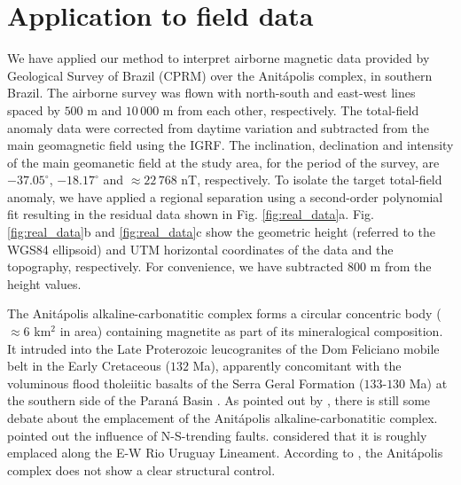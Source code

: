 \section{Application to field data}

We have applied our method to interpret airborne magnetic data provided by 
Geological Survey of Brazil (CPRM) over the Anit{\'a}polis complex, 
in southern Brazil. 
The airborne survey was flown with north-south and east-west lines spaced by $500$ m and $10\,000$ m from each other, respectively. 
The total-field anomaly data were corrected from daytime variation and 
subtracted from the main geomagnetic field using the IGRF. 
The inclination, declination and intensity of the main geomanetic field at the study area, 
for the period of the survey, are $-37.05^{\circ}$, $-18.17^{\circ}$ and 
$\approx 22 \, 768 $ nT, respectively.
To isolate the target total-field anomaly, we have applied 
a regional separation using a second-order polynomial fit resulting in the residual data 
shown in Fig. \ref{fig:real_data}a. 
Fig. \ref{fig:real_data}b and \ref{fig:real_data}c show the geometric height
(referred to the WGS84 ellipsoid) and UTM horizontal coordinates of the data and the 
topography, respectively. For convenience, we have subtracted $ 800 $ m from the height 
values.

The Anit{\'a}polis alkaline-carbonatitic complex forms a circular concentric body 
($\approx 6$ km$^{2}$ in area) containing magnetite as part of its mineralogical 
composition. It intruded into the Late Proterozoic leucogranites of the Dom Feliciano 
mobile belt in the Early Cretaceous ($132$ Ma), apparently concomitant with the 
voluminous flood tholeiitic basalts of the Serra Geral Formation ($133$-$130$ Ma) 
at the southern side of the Paran{\'a} Basin \citep{gibson-1999, scheibe-etal2005}.
As pointed out by \citet{GOMES2018}, there is still some debate about the emplacement 
of the Anit{\'a}polis alkaline-carbonatitic complex. 
\citet{melcher-coutinho1966} pointed out the influence of N-S-trending faults. 
\citet{scheibe-etal2005} considered that it is roughly emplaced along the E-W Rio 
Uruguay Lineament. According to \citet{riccomini-etal2005}, the Anit{\'a}polis 
complex does not show a clear structural control. 


